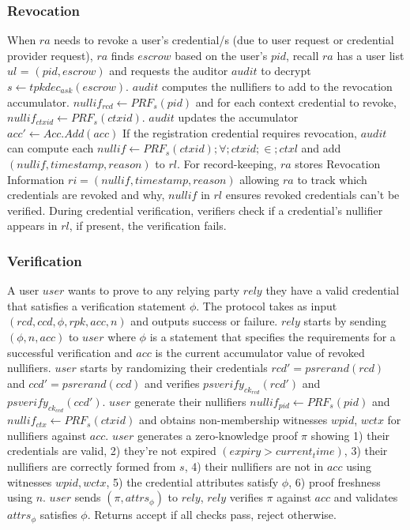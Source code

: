\subsubsection{Revocation}
When $ra$ needs to revoke a user's credential/s (due to user request or credential provider request), $ra$ finds $escrow$ based on the user's $pid$, recall $ra$ has a user list $ul$ = $(pid, escrow)$ and requests the auditor $audit$ to decrypt $s \gets tpkdec_{ask}(escrow)$. $audit$ computes the nullifiers to add to the revocation accumulator. $nullif_{rcd} \gets PRF_s(pid)$ and for each context credential to revoke, $nullif_{ctxid} \gets PRF_s(ctxid)$. $audit$ updates the accumulator $acc' \gets Acc.Add(acc)$
If the registration credential requires revocation, $audit$ can compute each $nullif \gets PRF_{s}(ctxid) ; \forall ; ctxid ; \in ; ctxl$ and add $(nullif, timestamp, reason)$ to $rl$. For record-keeping, $ra$ stores Revocation Information $ri = (nullif, timestamp, reason)$ allowing $ra$ to track which credentials are revoked and why, $nullif$ in $rl$ ensures revoked credentials can't be verified.
During credential verification, verifiers check if a credential's nullifier appears in $rl$, if present, the verification fails.
\subsubsection{Verification}
A user $user$ wants to prove to any relying party $rely$ they have a valid credential that satisfies a verification statement $\phi$.
The protocol takes as input $(rcd, ccd, \phi, rpk, acc, n)$ and outputs success or failure.
$rely$ starts by sending $(\phi, n, acc)$ to $user$ where $\phi$ is a statement that specifies the requirements for a successful verification and $acc$ is the current accumulator value of revoked nullifiers.
$user$ starts by randomizing their credentials $rcd' = psrerand(rcd)$ and $ccd' = psrerand(ccd)$ and verifies $psverify_{ck_{rcd}}(rcd')$ and $psverify_{ck_{ccd}}(ccd')$. $user$ generate their nullifiers $nullif_{pid} \gets PRF_s(pid)$ and $nullif_{ctx} \gets PRF_s(ctxid)$ and obtains non-membership witnesses $wpid$, $wctx$ for nullifiers against $acc$.
$user$ generates a zero-knowledge proof $\pi$ showing 1) their credentials are valid, 2) they're not expired $(expiry > current_time)$, 3) their nullifiers are correctly formed from $s$, 4) their nullifiers are not in $acc$ using witnesses $wpid, wctx$, 5) the credential attributes satisfy $\phi$, 6) proof freshness using $n$.
$user$ sends $(\pi, attrs_{\phi})$ to $rely$, $rely$ verifies $\pi$ against $acc$ and validates $attrs_{\phi}$ satisfies $\phi$. Returns accept if all checks pass, reject otherwise.




